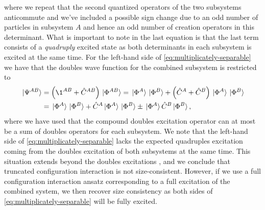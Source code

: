             where we repeat that the second quantized operators of the two
            subsystems anticommute and we've included a possible sign change due
            to an odd number of particles in subsystem $A$ and hence an odd
            number of creation operators in this determinant.
            What is important to note in the last equation is that the last term
            consists of a \emph{quadruply} excited state as both determinants in
            each subsystem is excited at the same time.
            For the left-hand side of \autoref{eq:multiplicately-separable} we
            have that the doubles wave function for the combined subsystem is
            restricted to
            \begin{align}
                \ket*{\Psi^{AB}}
                &= \para{\1^{AB} + \hat{C}^{AB}}\ket*{\slat^{AB}}
                = \ket*{\slat^{A}}\ket*{\slat^{B}}
                + \para{\hat{C}^{A} + \hat{C}^{B}}
                \ket*{\slat^{A}}\ket*{\slat^{B}}
                \\
                &=
                \ket*{\slat^{A}}\ket*{\slat^{B}}
                + \hat{C}^{A}\ket*{\slat^{A}}\ket*{\slat^{B}}
                \pm \ket*{\slat^{A}}\hat{C}^{B}\ket*{\slat^{B}},
            \end{align}
            where we have used that the compound doubles excitation operator can
            at most be a sum of doubles operators for each subsystem.
            We note that the left-hand side of
            \autoref{eq:multiplicately-separable} lacks the expected quadruples
            excitation coming from the doubles excitation of both subsystems at
            the same time.
            This situation extends beyond the doubles excitations
            \cite{size-extensivity}, and we conclude that truncated
            configuration interaction is not size-consistent.
            However, if we use a full configuration interaction ansatz
            corresponding to a full excitation of the combined system, we then
            recover size consistency as both sides of
            \autoref{eq:multiplicately-separable} will be fully excited.

